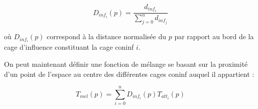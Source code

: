 \begin{displaymath}
  D_{inf_i}(p) = \frac{d_{inf_i}}{\sum_{j=0}^n d_{inf_j}}
\end{displaymath}

où $D_{inf_i}(p)$ correspond à la distance normalisée du $p$ par rapport au
bord de la cage d'influence constituant la cage coninf $i$.

On peut maintenant définir une fonction de mélange se basant sur la proximité
d'un point de l'espace au centre des différentes cages coninf auquel il
appartient :

\begin{displaymath}
  T_{mel}(p) = \sum_{i=0}^n D_{inf_i}(p) T_{att_i}(p)
\end{displaymath}

